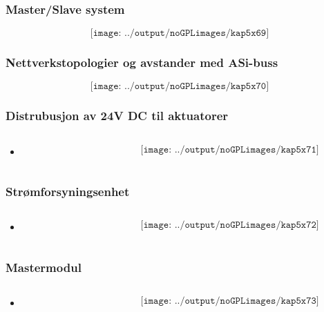 \documentclass[aspectratio=169,xcolor=dvipsnames]{beamer}
\begin{document}
\begin{frame}
	\frametitle{Master/Slave system}
	$$\texttt{[image: ../output/noGPLimages/kap5x69]}$$
\end{frame}
\begin{frame}
	\frametitle{Nettverkstopologier og avstander med ASi-buss}
	$$\texttt{[image: ../output/noGPLimages/kap5x70]}$$
\end{frame}
\begin{frame}
	\frametitle{Distrubusjon av 24V DC til aktuatorer}
	\begin{columns}
		\begin{column}{0.5\textwidth}

			\begin{itemize}
				\item      
			\end{itemize}

			
		\end{column}

		\begin{column}{0.5\textwidth}
	$$\texttt{[image: ../output/noGPLimages/kap5x71]}$$
		\end{column}
	\end{columns}
\end{frame}
\begin{frame}
	\frametitle{Strømforsyningsenhet}
	\begin{columns}
		\begin{column}{0.5\textwidth}

			\begin{itemize}
				\item      
			\end{itemize}

			
		\end{column}

		\begin{column}{0.5\textwidth}
	$$\texttt{[image: ../output/noGPLimages/kap5x72]}$$
		\end{column}
	\end{columns}
\end{frame}
\begin{frame}
	\frametitle{Mastermodul}
	\begin{columns}
		\begin{column}{0.5\textwidth}

			\begin{itemize}
				\item      
			\end{itemize}

			
		\end{column}

		\begin{column}{0.5\textwidth}
	$$\texttt{[image: ../output/noGPLimages/kap5x73]}$$
		\end{column}
	\end{columns}
\end{frame}
\end{document}
